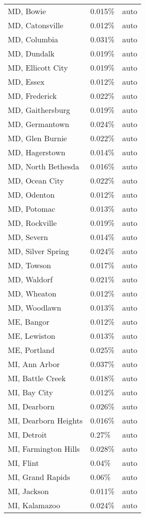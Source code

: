 \begin{longtable}[]{@{}lll@{}}
MD, Bowie & 0.015\% & auto \\
MD, Catonsville & 0.012\% & auto \\
MD, Columbia & 0.031\% & auto \\
MD, Dundalk & 0.019\% & auto \\
MD, Ellicott City & 0.019\% & auto \\
MD, Essex & 0.012\% & auto \\
MD, Frederick & 0.022\% & auto \\
MD, Gaithersburg & 0.019\% & auto \\
MD, Germantown & 0.024\% & auto \\
MD, Glen Burnie & 0.022\% & auto \\
MD, Hagerstown & 0.014\% & auto \\
MD, North Bethesda & 0.016\% & auto \\
MD, Ocean City & 0.022\% & auto \\
MD, Odenton & 0.012\% & auto \\
MD, Potomac & 0.013\% & auto \\
MD, Rockville & 0.019\% & auto \\
MD, Severn & 0.014\% & auto \\
MD, Silver Spring & 0.024\% & auto \\
MD, Towson & 0.017\% & auto \\
MD, Waldorf & 0.021\% & auto \\
MD, Wheaton & 0.012\% & auto \\
MD, Woodlawn & 0.013\% & auto \\
ME, Bangor & 0.012\% & auto \\
ME, Lewiston & 0.013\% & auto \\
ME, Portland & 0.025\% & auto \\
MI, Ann Arbor & 0.037\% & auto \\
MI, Battle Creek & 0.018\% & auto \\
MI, Bay City & 0.012\% & auto \\
MI, Dearborn & 0.026\% & auto \\
MI, Dearborn Heights & 0.016\% & auto \\
MI, Detroit & 0.27\% & auto \\
MI, Farmington Hills & 0.028\% & auto \\
MI, Flint & 0.04\% & auto \\
MI, Grand Rapids & 0.06\% & auto \\
MI, Jackson & 0.011\% & auto \\
MI, Kalamazoo & 0.024\% & auto \\

\end{longtable}
